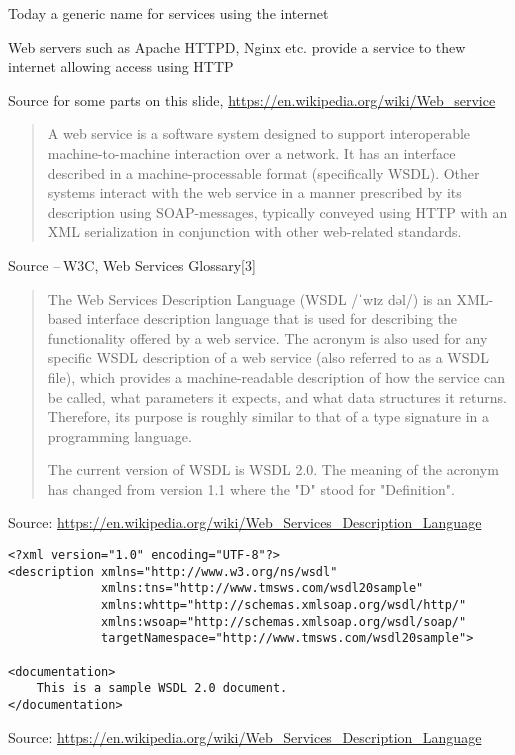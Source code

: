 \documentclass[Screen16to9,17pt]{foils}
\begin{document}
\begin{list2}
\item Today a generic name for services using the internet
\item Web servers such as Apache HTTPD, Nginx etc. provide a service to thew internet allowing access using HTTP
\item Source for some parts on this slide, \url{https://en.wikipedia.org/wiki/Web_service}
\end{list2}





\begin{quote}
A web service is a software system designed to support interoperable machine-to-machine interaction over a network. It has an interface described in a machine-processable format (specifically WSDL). Other systems interact with the web service in a manner prescribed by its description using SOAP-messages, typically conveyed using HTTP with an XML serialization in conjunction with other web-related standards.
\end{quote}
Source -- W3C, Web Services Glossary[3]



\begin{quote}
  The Web Services Description Language (WSDL /ˈwɪz dəl/) is an XML-based interface description language that is used for describing the functionality offered by a web service. The acronym is also used for any specific WSDL description of a web service (also referred to as a WSDL file), which provides a machine-readable description of how the service can be called, what parameters it expects, and what data structures it returns. Therefore, its purpose is roughly similar to that of a type signature in a programming language.

  The current version of WSDL is WSDL 2.0. The meaning of the acronym has changed from version 1.1 where the "D" stood for "Definition".
\end{quote}
Source: \url{https://en.wikipedia.org/wiki/Web_Services_Description_Language}



\begin{verbatim}
<?xml version="1.0" encoding="UTF-8"?>
<description xmlns="http://www.w3.org/ns/wsdl"
             xmlns:tns="http://www.tmsws.com/wsdl20sample"
             xmlns:whttp="http://schemas.xmlsoap.org/wsdl/http/"
             xmlns:wsoap="http://schemas.xmlsoap.org/wsdl/soap/"
             targetNamespace="http://www.tmsws.com/wsdl20sample">

<documentation>
    This is a sample WSDL 2.0 document.
</documentation>
\end{verbatim}
Source: \url{https://en.wikipedia.org/wiki/Web_Services_Description_Language}
\end{document}
